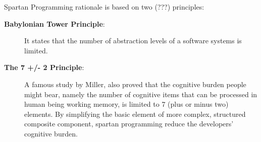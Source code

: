 Spartan Programming rationale is based on two (???) principles:

\begin{description}
 \item [\textbf{Babylonian Tower Principle}: ] It states that the
number of abstraction levels of a software systems is limited.
  \item [\textbf{The 7 +/- 2 Principle}: ] A famous study
by Miller, also proved that the cognitive burden people might bear, namely the
number of cognitive items that can be processed in human being working memory,
is limited to 7 (plus or minus two) elements. By simplifying the basic element
of more complex, structured composite component, spartan programming reduce the
developers' cognitive burden.
\end{description} 

% 
% 
% 
% 
% 
